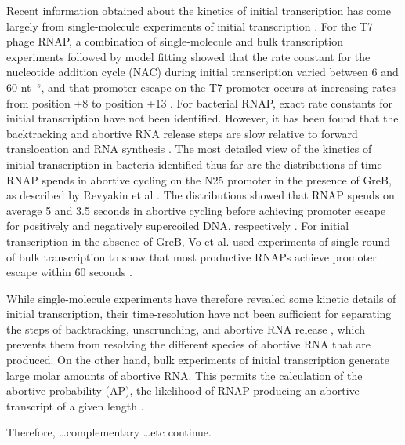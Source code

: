 Recent information obtained about the kinetics of initial transcription has
come largely from single-molecule experiments of initial transcription
\cite{revyakin_abortive_2006, kapanidis_initial_2006,
kapanidis_retention_2005, margeat_direct_2006, tang_real-time_2009}. For the
T7 phage RNAP, a combination of single-molecule and bulk transcription
experiments followed by model fitting showed that the rate constant for the
nucleotide addition cycle (NAC) during initial transcription varied between 6
and 60 nt$^{-s}$, and that promoter escape on the T7 promoter occurs at
increasing rates from position +8 to position +13 \cite{tang_real-time_2009}.
For bacterial RNAP, exact rate constants for initial transcription have not
been identified. However, it has been found that the backtracking and
abortive RNA release steps are slow relative to forward translocation and RNA
synthesis \cite{margeat_direct_2006, revyakin_abortive_2006}. The most
detailed view of the kinetics of initial transcription in bacteria identified thus far
are the distributions of time RNAP spends in abortive cycling on the N25 promoter
in the presence of GreB, as described by Revyakin et al
\cite{revyakin_abortive_2006}. The distributions showed that RNAP spends on
average 5 and 3.5 seconds in abortive cycling before achieving promoter escape
for positively and negatively supercoiled DNA, respectively
\cite{revyakin_abortive_2006}.
For initial transcription in the absence of
GreB, Vo et al. used experiments of single round of bulk transcription to show
that most productive RNAPs achieve promoter escape within 60 seconds
\cite{vo_vitro_2003-1}.

While single-molecule experiments have therefore revealed some kinetic details
of initial transcription, their time-resolution have not been sufficient for
separating the steps of backtracking, unscrunching, and abortive RNA release
\cite{revyakin_abortive_2006, margeat_direct_2006}, which prevents them from
resolving the different species of abortive RNA that are produced. On the
other hand, bulk experiments of initial transcription generate large molar
amounts of abortive RNA. This permits the calculation of the abortive
probability (AP), the likelihood of RNAP producing an abortive transcript of a
given length \cite{hsu_quantitative_1996, hsu_promoter_2002}.

Therefore, \ldots complementary \ldots etc continue. 
%

